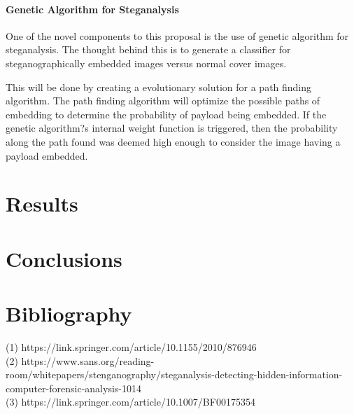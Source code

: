 \documentclass[12pt]{article}
\begin{document}
\paragraph{Genetic Algorithm for Steganalysis}
\par One of the novel components to this proposal is the use of genetic algorithm for steganalysis. The thought behind this is to generate a classifier for steganographically embedded images versus normal cover images.
\par This will be done by creating a evolutionary solution for a path finding algorithm. The path finding algorithm will optimize the possible paths of embedding to determine the probability of payload being embedded. If the genetic algorithm?s internal weight function is triggered, then the probability along the path found was deemed high enough to consider the image having a payload embedded.

\section{Results}


\section{Conclusions}

\section{Bibliography}
(1) https://link.springer.com/article/10.1155/2010/876946 \\
(2) https://www.sans.org/reading-room/whitepapers/stenganography/steganalysis-detecting-hidden-information-computer-forensic-analysis-1014 \\
(3) https://link.springer.com/article/10.1007/BF00175354
\end{document}
